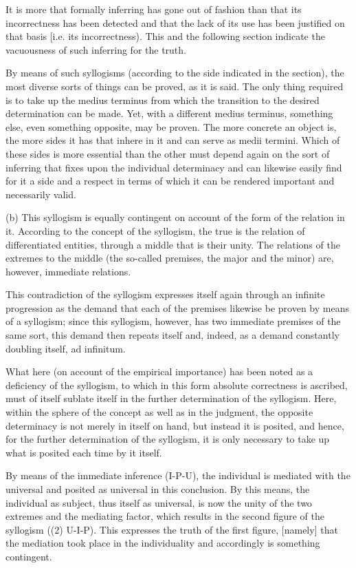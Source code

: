 It is more that formally inferring has gone out of fashion
than that its incorrectness has been detected
and that the lack of its use has been justified
on that basis [i.e. its incorrectness).
This and the following section indicate
the vacuousness of such inferring for the truth.

By means of such syllogisms
(according to the side indicated in the section),
the most diverse sorts of things can be proved, as it is said.
The only thing required is to take up the medius terminus
from which the transition to the desired determination can be made.
Yet, with a different medius terminus,
something else, even something opposite, may be proven.
The more concrete an object is,
the more sides it has that inhere in it
and can serve as medii termini.
Which of these sides is more essential than the other
must depend again on the sort of inferring
that fixes upon the individual determinacy
and can likewise easily find for it a side and a respect
in terms of which it can be rendered
important and necessarily valid.

(b) This syllogism is equally contingent
on account of the form of the relation in it.
According to the concept of the syllogism,
the true is the relation of differentiated entities,
through a middle that is their unity.
The relations of the extremes to the middle
(the so-called premises, the major and the minor)
are, however, immediate relations.

This contradiction of the syllogism expresses itself
again through an infinite progression as the demand
that each of the premises likewise be proven by means of a syllogism;
since this syllogism, however, has two immediate premises
of the same sort, this demand then repeats itself
and, indeed, as a demand constantly doubling itself, ad infinitum.

What here (on account of the empirical importance)
has been noted as a deficiency of the syllogism,
to which in this form absolute correctness is ascribed,
must of itself sublate itself in
the further determination of the syllogism.
Here, within the sphere of the concept
as well as in the judgment,
the opposite determinacy is not merely
in itself on hand, but instead it is posited,
and hence, for the further determination of the syllogism,
it is only necessary to take up what is posited
each time by it itself.

By means of the immediate inference (I-P-U),
the individual is mediated with the universal
and posited as universal in this conclusion.
By this means, the individual as subject, thus itself as universal,
is now the unity of the two extremes and the mediating factor,
which results in the second figure of the syllogism
((2) U-I-P).
This expresses the truth of the first figure,
[namely] that the mediation took place in the individuality
and accordingly is something contingent.

